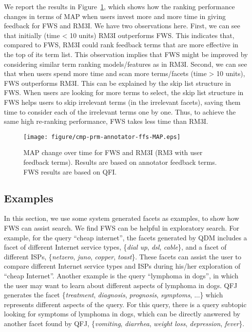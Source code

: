 We report the results in Figure~\ref{fig:ex-rm3i}, which shows how the ranking performance changes in terms of MAP when users invest more and more time in giving feedback for FWS and RM3I. We have two observations here. First, we can see that initially (time < 10 units) RM3I outperforms FWS. This indicates that, compared to FWS, RM3I could rank feedback terms that are more effective in the top of its term list. This observation implies that FWS might be improved by considering similar term ranking models/features as in RM3I. Second, we can see that when users spend more time and scan more terms/facets (time > 10 units), FWS outperforms RM3I. This can be explained by the skip list structure in FWS. When users are looking for more terms to select, the skip list structure in FWS helps users to skip irrelevant terms (in the irrelevant facets), saving them time to consider each of the irrelevant terms one by one. Thus, to achieve the same high re-ranking performance, FWS takes less time than RM3I.
 
\begin{figure}[!ht]
\centering
\texttt{[image: figure/cmp-prm-annotator-ffs-MAP.eps]}
\caption{MAP change over time for FWS and RM3I (RM3 with user feedback terms). Results are based on annotator feedback terms. FWS results are based on QFI.}
\label{fig:ex-rm3i}
\end{figure}

\subsection{Examples}
In this section, we use some system generated facets as examples, to show how FWS can assist search. We find FWS can be helpful in exploratory search. 
For example, for the query ``cheap internet'', the facets generated by QDM includes a facet of different Internet service types, \{\textit{dial up}, \textit{dsl}, \textit{cable}\}, and a facet of different ISPs, \{\textit{netzero}, \textit{juno}, \textit{copper}, \textit{toast}\}. These facets can assist the user to compare different Internet service types and ISPs during his/her exploration of ``cheap Internet''. Another example is the query ``lymphoma in dogs'', in which the user may want to learn about different aspects of lymphoma in dogs. QFJ generates the facet \{\textit{treatment}, \textit{diagnosis}, \textit{prognosis}, \textit{symptoms}, ...\} which represents different aspects of the query. For this query, there is a query subtopic looking for symptoms of lymphoma in dogs, which can be directly answered by another facet found by QFJ, \{\textit{vomiting}, \textit{diarrhea}, \textit{weight loss}, \textit{depression}, \textit{fever}\}. 


